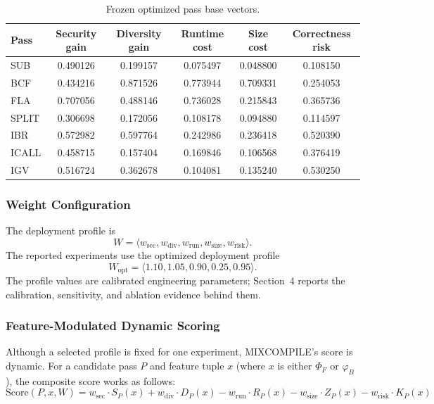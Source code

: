 \documentclass[pdflatex,sn-mathphys-num]{sn-jnl}
\theoremstyle{thmstyleone}%
\theoremstyle{thmstyletwo}%
\theoremstyle{thmstylethree}%
\begin{document}
\begin{table}[!t]
\centering
\footnotesize
\caption{Frozen optimized pass base vectors.}
\label{tab:optimized_pass_vectors}
\begin{tabular}{lccccc}
\toprule
Pass & Security gain & Diversity gain & Runtime cost & Size cost & Correctness risk \\
\midrule
SUB   & 0.490126 & 0.199157 & 0.075497 & 0.048800 & 0.108150 \\
BCF   & 0.434216 & 0.871526 & 0.773944 & 0.709331 & 0.254053 \\
FLA   & 0.707056 & 0.488146 & 0.736028 & 0.215843 & 0.365736 \\
SPLIT & 0.306698 & 0.172056 & 0.108178 & 0.094880 & 0.114597 \\
IBR   & 0.572982 & 0.597764 & 0.242986 & 0.236418 & 0.520390 \\
ICALL & 0.458715 & 0.157404 & 0.169846 & 0.106568 & 0.376419 \\
IGV   & 0.516724 & 0.362678 & 0.104081 & 0.135240 & 0.530250 \\
\bottomrule
\end{tabular}
\end{table}

\subsubsection{Weight Configuration}

The deployment profile is
\begin{equation}
W = \langle w_{\mathrm{sec}}, w_{\mathrm{div}}, w_{\mathrm{run}},
w_{\mathrm{size}}, w_{\mathrm{risk}} \rangle .
\label{eq:weights}
\end{equation}
The reported experiments use the optimized deployment profile
\begin{equation}
W_{\mathrm{opt}}=\langle1.10,1.05,0.90,0.25,0.95\rangle .
\label{eq:optimized_weights}
\end{equation}
The profile values are calibrated engineering parameters; Section~4 reports the
calibration, sensitivity, and ablation evidence behind them.

\subsubsection{Feature-Modulated Dynamic Scoring}

Although a selected profile is fixed for one experiment, MIXCOMPILE's score is
dynamic. For a candidate pass $P$ and feature tuple $x$ (where $x$ is either $\Phi_F$
or $\varphi_B$), the composite score works as follows:
\begin{equation}
\text{Score}(P, x, W) = w_{\mathrm{sec}} \cdot S_P(x) + w_{\mathrm{div}} \cdot D_P(x) - w_{\mathrm{run}} \cdot R_P(x) - w_{\mathrm{size}} \cdot Z_P(x) - w_{\mathrm{risk}} \cdot K_P(x)
\label{eq:score}
\end{equation}
\end{document}
